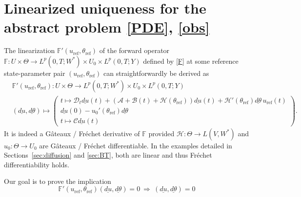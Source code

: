 \documentclass[12pt]{article}
\newcommand\skiplinear[1]{#1}
\newcommand\uld[1]{\underline{d#1}}
\newcommand\DD{\mathcal{D}}
\newcommand\calA{\mathcal{A}}
\newcommand\BB{\mathcal{B}}
\newcommand\HH{\mathcal{H}}
\begin{document}
\section{\skiplinear{Linearized} uniqueness for the abstract problem
\eqref{PDE}, \eqref{obs}
}\label{sec:uniqueness}
The linearization $\mathbb{F}'(u_{\text{ref}},\theta_{\text{ref}})$ of the forward operator $\mathbb{F}:U\times\Theta\to L^p(0,T;W^*)\times U_0\times L^p(0,T;Y)$ defined by \eqref{F} at some reference state-parameter pair $(u_{\text{ref}},\theta_{\text{ref}})$ can straightforwardly be derived as 
\begin{equation}\label{Fprime}
\begin{aligned}
&\mathbb{F}'(u_{\text{ref}},\theta_{\text{ref}}):U\times\Theta\to L^p(0,T;W^*)\times U_0\times L^p(0,T;Y)\\
&(\uld{u},\uld{\theta})\mapsto \left(\begin{array}{l}
t\mapsto\DD_t \uld{u}(t) +(\calA+ \BB(t)+\HH(\theta_{\text{ref}}))\uld{u}(t)+\HH'(\theta_{\text{ref}})\uld{\theta}\, u_{\text{ref}}(t)\\
\uld{u}(0)-u_0'(\theta_{\text{ref}})\uld{\theta}\\
t\mapsto\mathcal{C}\uld{u}(t)
\end{array}\right).
\end{aligned}
\end{equation}
It is indeed a G\^{a}teaux / Fr\'{e}chet derivative of $\mathbb{F}$ provided $\HH:\Theta\to L(V,W^*)$ and $u_0:\Theta\to U_0$ are G\^{a}teaux / Fr\'{e}chet differentiable. In the examples detailed in Sections~\ref{sec:diffusion} and \ref{sec:BT}, both are linear and thus Fr\'{e}chet differentiability holds.

Our goal is to prove the implication 
\begin{equation}\label{Fprimeinjective}
\mathbb{F}'(u_{\text{ref}},\theta_{\text{ref}})(\uld{u},\uld{\theta})=0 \ \Rightarrow  \ (\uld{u},\uld{\theta})=0
\end{equation}
\end{document}
